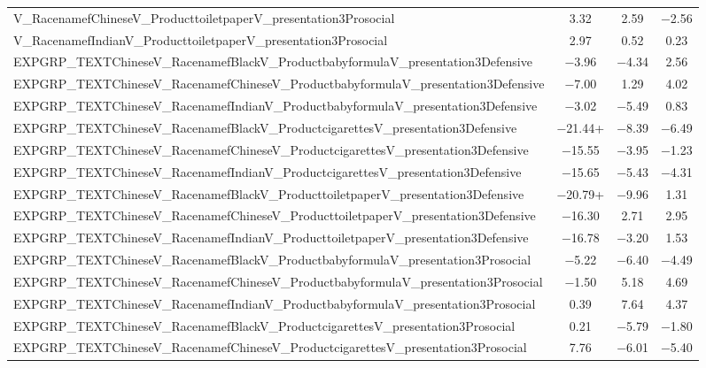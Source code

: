 \documentclass[]{report}
\begin{document}
\begin{table}
{\begin{tabular}[t]{lccc}
		V\_RacenamefChineseV\_ProducttoiletpaperV\_presentation3Prosocial & \num{3.32} & \num{2.59} & \num{-2.56}\\
		V\_RacenamefIndianV\_ProducttoiletpaperV\_presentation3Prosocial & \num{2.97} & \num{0.52} & \num{0.23}\\
		EXPGRP\_TEXTChineseV\_RacenamefBlackV\_ProductbabyformulaV\_presentation3Defensive & \num{-3.96} & \num{-4.34} & \num{2.56}\\
		EXPGRP\_TEXTChineseV\_RacenamefChineseV\_ProductbabyformulaV\_presentation3Defensive & \num{-7.00} & \num{1.29} & \num{4.02}\\
		EXPGRP\_TEXTChineseV\_RacenamefIndianV\_ProductbabyformulaV\_presentation3Defensive & \num{-3.02} & \num{-5.49} & \num{0.83}\\
		EXPGRP\_TEXTChineseV\_RacenamefBlackV\_ProductcigarettesV\_presentation3Defensive & \num{-21.44}+ & \num{-8.39} & \num{-6.49}\\
		EXPGRP\_TEXTChineseV\_RacenamefChineseV\_ProductcigarettesV\_presentation3Defensive & \num{-15.55} & \num{-3.95} & \num{-1.23}\\
		EXPGRP\_TEXTChineseV\_RacenamefIndianV\_ProductcigarettesV\_presentation3Defensive & \num{-15.65} & \num{-5.43} & \num{-4.31}\\
		EXPGRP\_TEXTChineseV\_RacenamefBlackV\_ProducttoiletpaperV\_presentation3Defensive & \num{-20.79}+ & \num{-9.96} & \num{1.31}\\
		EXPGRP\_TEXTChineseV\_RacenamefChineseV\_ProducttoiletpaperV\_presentation3Defensive & \num{-16.30} & \num{2.71} & \num{2.95}\\
		EXPGRP\_TEXTChineseV\_RacenamefIndianV\_ProducttoiletpaperV\_presentation3Defensive & \num{-16.78} & \num{-3.20} & \num{1.53}\\
		EXPGRP\_TEXTChineseV\_RacenamefBlackV\_ProductbabyformulaV\_presentation3Prosocial & \num{-5.22} & \num{-6.40} & \num{-4.49}\\
		EXPGRP\_TEXTChineseV\_RacenamefChineseV\_ProductbabyformulaV\_presentation3Prosocial & \num{-1.50} & \num{5.18} & \num{4.69}\\
		EXPGRP\_TEXTChineseV\_RacenamefIndianV\_ProductbabyformulaV\_presentation3Prosocial & \num{0.39} & \num{7.64} & \num{4.37}\\
		EXPGRP\_TEXTChineseV\_RacenamefBlackV\_ProductcigarettesV\_presentation3Prosocial & \num{0.21} & \num{-5.79} & \num{-1.80}\\
		EXPGRP\_TEXTChineseV\_RacenamefChineseV\_ProductcigarettesV\_presentation3Prosocial & \num{7.76} & \num{-6.01} & \num{-5.40}\\

\end{tabular}}
\end{table}
\end{document}
